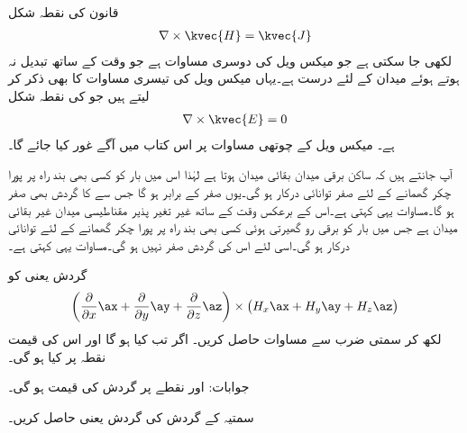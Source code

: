  قانون کی نقطہ شکل
\begin{align}\label{مساوات-مقناطیسی_مقناطیسی_گردش_صفر}
\nabla \times \kvec{H}=\kvec{J}
\end{align}
لکھی جا سکتی ہے جو  میکس ویل کی دوسری مساوات ہے جو وقت کے ساتھ تبدیل نہ ہوتے ہوئے میدان کے لئے درست ہے۔یہاں میکس ویل کی تیسری مساوات کا بھی ذکر کر لیتے ہیں جو  کی نقطہ شکل
\begin{align}\label{مساوات-مقناطیسی_برقی_گردش_صفر}
\nabla \times \kvec{E}=0
\end{align}
ہے۔ میکس ویل کے چوتھی مساوات پر اس کتاب میں آگے غور کیا جائے گا۔

آپ جانتے ہیں کہ ساکن برقی میدان  بقائی میدان ہوتا ہے لہٰذا اس میں بار  کو کسی بھی بند راہ پر پورا چکر گھمانے کے لئے صفر توانائی درکار ہو گی۔یوں  صفر کے برابر ہو گا جس سے  کا گردش بھی صفر ہو گا۔مساوات  یہی کہتی ہے۔اس کے برعکس وقت کے ساتھ غیر تغیر پذیر مقناطیسی میدان غیر بقائی میدان ہے جس میں بار کو برقی رو گھیرتی ہوئی کسی بھی بند راہ پر پورا چکر گھمانے کے لئے توانائی درکار ہو گی۔اسی لئے اس کی گردش صفر نہیں ہو گی۔مساوات  یہی کہتی ہے۔


گردش یعنی  کو
\begin{align*}
\left(\frac{\partial }{\partial x}\ax+\frac{\partial }{\partial y}\ay+\frac{\partial }{\partial z}\az \right) \times \left(H_x \ax+H_y \ay+H_z \az \right)
\end{align*}
لکھ کر سمتی ضرب سے مساوات  حاصل کریں۔
اگر  تب  کیا ہو گا اور اس کی قیمت نقطہ  پر کیا ہو گی۔

جوابات: اور نقطے پر گردش کی قیمت  ہو گی۔

سمتیہ  کے گردش کی گردش یعنی  حاصل کریں۔

